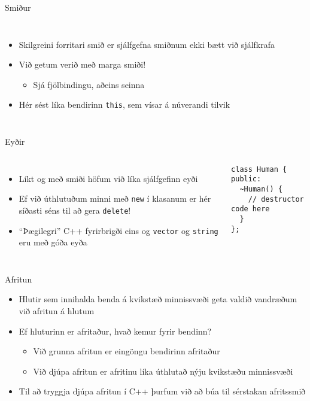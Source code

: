 \documentclass{beamer}
\begin{document}
\begin{frame}{Smiður}
    \begin{columns}
        \begin{itemize}
            \item Skilgreini forritari smið er sjálfgefna smiðnum ekki bætt við sjálfkrafa
            \item Við getum verið með marga smiði!
            \begin{itemize}
                \item Sjá fjölbindingu, aðeins seinna
            \end{itemize}
            \item Hér sést líka bendirinn \texttt{this}, sem vísar á núverandi tilvik
        \end{itemize}
    \end{columns}
\end{frame}

\begin{frame}[fragile]{Eyðir}
    \begin{columns}
        \begin{itemize}
            \item Líkt og með smiði höfum við líka sjálfgefinn eyði
            \item Ef við úthlutuðum minni með \texttt{new} í klasanum er hér síðasti séns til að gera \texttt{delete}!
            \item ``Þægilegri'' C++ fyrirbrigði eins og \texttt{vector} og \texttt{string} eru með góða eyða
        \end{itemize}
        \begin{verbatim}
class Human {
public:
  ~Human() {
    // destructor code here
  }
};
        \end{verbatim}
    \end{columns}
\end{frame}

\begin{frame}{Afritun }
    \begin{itemize}
        \item Hlutir sem innihalda benda á kvikstæð minnissvæði geta valdið vandræðum við afritun á hlutum
        \item Ef hluturinn er afritaður, hvað kemur fyrir bendinn?
        \begin{itemize}
            \item Við grunna afritun  er eingöngu bendirinn afritaður 
            \item Við djúpa afritun  er afritinu líka úthlutað nýju kvikstæðu minnissvæði
        \end{itemize}
        \item Til að tryggja djúpa afritun í C++ þurfum við að búa til sérstakan afritssmið 
\end{itemize}
\end{frame}
\end{document}
